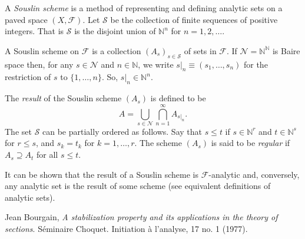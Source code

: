 \documentclass[12pt]{article}
\begin{document}

A \emph{Souslin scheme} is a method of representing and defining analytic sets on a paved space $(X,\mathcal{F})$.
Let $\mathcal{S}$ be the collection of finite sequences of positive integers. That is $\mathcal{S}$ is the disjoint union of $\mathbb{N}^n$ for $n=1,2,\ldots$.

A Souslin scheme on $\mathcal{F}$ is a collection $(A_s)_{s\in\mathcal{S}}$ of sets in $\mathcal{F}$.
If $\mathcal{N}=\mathbb{N}^\mathbb{N}$ is Baire space then, for any $s\in\mathcal{N}$ and $n\in\mathbb{N}$, we write $s|_n\equiv (s_1,\ldots,s_n)$ for the restriction of $s$ to $\{1,\ldots,n\}$. So, $s|_n\in\mathbb{N}^n$.

The \emph{result} of the Souslin scheme $(A_s)$ is defined to be
\begin{equation*}
A=\bigcup_{s\in\mathcal{N}}\bigcap_{n=1}^\infty A_{s|_n}.
\end{equation*}
The set $\mathcal{S}$ can be partially ordered as follows. Say that $s\le t$ if $s\in\mathbb{N}^r$ and $t\in\mathbb{N}^s$ for $r\le s$, and $s_k=t_k$ for $k=1,\ldots,r$.
The scheme $(A_s)$ is said to be \emph{regular} if $A_s\supseteq A_t$ for all $s\le t$.

It can be shown that the result of a Souslin scheme is $\mathcal{F}$-analytic and, conversely, any analytic set is the result of some scheme (see equivalent definitions of analytic sets).

\begin{thebibliography}{9}
Jean Bourgain, \emph{A stabilization property and its applications in the theory of sections}. S{\'e}minaire Choquet. Initiation {\`a} l'analyse, 17 no. 1 (1977).
\end{thebibliography}

\end{document}
